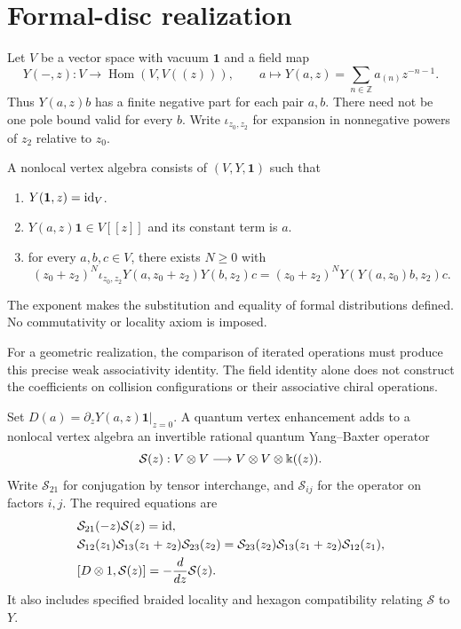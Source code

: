 \section{Formal-disc realization}
Let \(V\) be a vector space with vacuum \(\mathbf1\) and a field map
\[
 Y(-,z):V\longrightarrow\operatorname{Hom}(V,V((z))),
 \qquad a\longmapsto Y(a,z)=\sum_{n\in\mathbb Z}a_{(n)}z^{-n-1}.
\]
Thus \(Y(a,z)b\) has a finite negative part for each pair \(a,b\).
There need not be one pole bound valid for every \(b\).
Write \(\iota_{z_0,z_2}\) for expansion in nonnegative powers of \(z_2\) relative to \(z_0\).

\begin{definition}
A nonlocal vertex algebra consists of \((V,Y,\mathbf1)\) such that
\begin{enumerate}
\item \(Y(\mathbf1,z)=\operatorname{id}_V\).
\item \(Y(a,z)\mathbf1\in V[[z]]\) and its constant term is \(a\).
\item for every \(a,b,c\in V\), there exists \(N\ge0\) with
\[
 (z_0+z_2)^N\iota_{z_0,z_2}Y(a,z_0+z_2)Y(b,z_2)c
 = (z_0+z_2)^N Y(Y(a,z_0)b,z_2)c.
\]
\end{enumerate}
The exponent makes the substitution and equality of formal distributions defined.
No commutativity or locality axiom is imposed.
\end{definition}

For a geometric realization, the comparison of iterated operations must produce this precise weak associativity identity.
The field identity alone does not construct the coefficients on collision configurations or their associative chiral operations.

\begin{definition}
Set \(D(a)=\partial_zY(a,z)\mathbf1|_{z=0}\).
A quantum vertex enhancement adds to a nonlocal vertex algebra an invertible rational quantum Yang--Baxter operator
\[
 \mathcal S(z):V\otimes V\longrightarrow V\otimes V\otimes\Bbbk((z)).
\]
Write \(\mathcal S_{21}\) for conjugation by tensor interchange, and \(\mathcal S_{ij}\) for the operator on factors \(i,j\).
The required equations are
\begin{align*}
 &\mathcal S_{21}(-z)\mathcal S(z)=\operatorname{id},\\
 &\mathcal S_{12}(z_1)\mathcal S_{13}(z_1+z_2)\mathcal S_{23}(z_2)
 =\mathcal S_{23}(z_2)\mathcal S_{13}(z_1+z_2)\mathcal S_{12}(z_1),\\
 &[D\otimes1,\mathcal S(z)]=-\frac{d}{dz}\mathcal S(z).
\end{align*}
It also includes specified braided locality and hexagon compatibility relating \(\mathcal S\) to \(Y\).
\end{definition}

